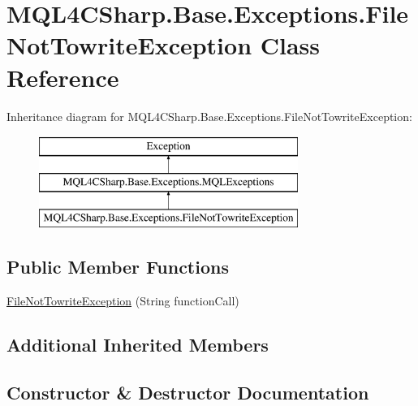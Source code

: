 \hypertarget{class_m_q_l4_c_sharp_1_1_base_1_1_exceptions_1_1_file_not_towrite_exception}{}\section{M\+Q\+L4\+C\+Sharp.\+Base.\+Exceptions.\+File\+Not\+Towrite\+Exception Class Reference}
\label{class_m_q_l4_c_sharp_1_1_base_1_1_exceptions_1_1_file_not_towrite_exception}
Inheritance diagram for M\+Q\+L4\+C\+Sharp.\+Base.\+Exceptions.\+File\+Not\+Towrite\+Exception\+:\begin{figure}[H]
\begin{center}
\leavevmode
\includegraphics[height=3.000000cm]{class_m_q_l4_c_sharp_1_1_base_1_1_exceptions_1_1_file_not_towrite_exception}
\end{center}
\end{figure}
\subsection*{Public Member Functions}
\begin{DoxyCompactItemize}
\item 
\hyperlink{class_m_q_l4_c_sharp_1_1_base_1_1_exceptions_1_1_file_not_towrite_exception_a4fbfeb2d0805081cc8996a302a4a1fa9}{File\+Not\+Towrite\+Exception} (String function\+Call)
\end{DoxyCompactItemize}
\subsection*{Additional Inherited Members}


\subsection{Constructor \& Destructor Documentation}

